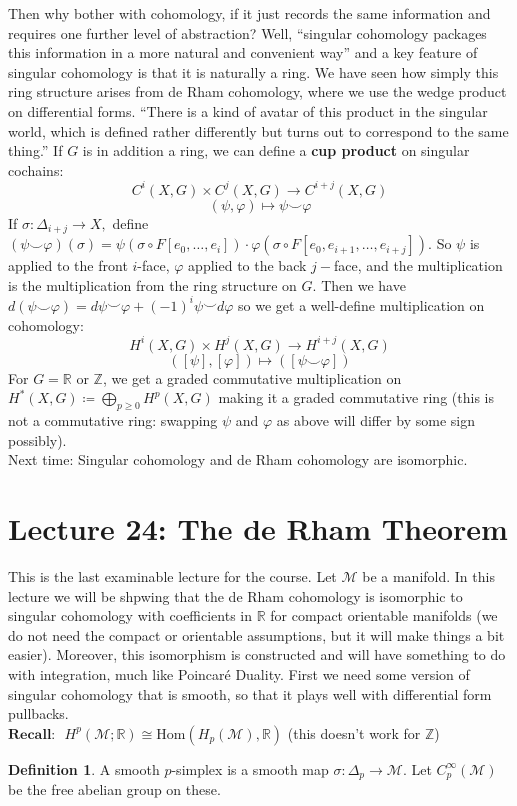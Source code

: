 \documentclass[10pt]{article}
\theoremstyle{plain}
\theoremstyle{definition}
\newtheorem{defn}[thm]{Definition} %
\newcommand{\Recall}{\textbf{Recall: }}
\newcommand{\Real}{\mathbb{R}}
\newcommand{\man}{\mathcal{M}}
\newcommand{\Hom}[2]{\text{Hom}\left(#1,#2\right)}
\newcommand{\deriv}{d}
\newcommand{\Zint}{\mathbb{Z}}
\newcommand{\mysection}[1]{
    \section*{#1}
    \addcontentsline{toc}{section}{#1}
    \addtocounter{section}{1}
    \setcounter{subsection}{0}

}
\begin{document}
Then why bother with cohomology, if it just records the same information and requires one further level of abstraction? Well, ``singular cohomology packages this information in a more natural and convenient way'' and a key feature of singular cohomology is that it is naturally a ring. We have seen how simply this ring structure arises from de Rham cohomology, where we use the wedge product on differential forms. ``There is a kind of avatar of this product in the singular world, which is defined rather differently but turns out to correspond to the same thing.'' If $G$ is in addition a ring, we can define a \textbf{cup product} on singular cochains:
$$C^i(X,G) \times C^j(X,G) \to C^{i+j}(X,G)$$
$$(\psi, \varphi) \mapsto \psi \smile \varphi$$
If $\sigma : \Delta_{i+j} \to X,$ define $(\psi \smile \varphi)(\sigma) = \psi(\sigma \circ F[e_0,\ldots,e_i]) \cdot \varphi(\sigma \circ F[e_0, e_{i+1} , \ldots , e_{i+j}])$. So $\psi$ is applied to the front $i$-face, $\varphi$ applied to the back $j-$face, and the multiplication is the multiplication from the ring structure on $G$. Then we have $\deriv(\psi \smile \varphi) = \deriv \psi \smile \varphi + (-1)^i \psi \smile \deriv \varphi$ so we get a well-define multiplication on cohomology:
$$H^i(X,G) \times H^j(X,G) \to H^{i+j}(X,G) $$
$$([\psi] ,[\varphi]) \mapsto ([\psi \smile \varphi])$$
For $G = \Real$ or $\Zint$, we get a graded commutative multiplication on $H^*(X,G) \coloneqq \bigoplus\limits_{p\geq 0} H^p(X,G)$ making it a graded commutative ring (this is not a commutative ring: swapping $\psi$ and $\varphi$ as above will differ by some sign possibly).\\
Next time: Singular cohomology and de Rham cohomology are isomorphic.

\mysection{Lecture 24: The de Rham Theorem}
This is the last examinable lecture for the course. Let $\man$ be a manifold. In this lecture we will be shpwing that the de Rham cohomology is isomorphic to singular cohomology with coefficients in $\Real$ for compact orientable manifolds (we do not need the compact or orientable assumptions, but it will make things a bit easier). Moreover, this isomorphism is constructed and will have something to do with integration, much like Poincar\'e Duality. First we need some version of singular cohomology that is smooth, so that it plays well with differential form pullbacks.\\
$\Recall$ $H^p(\man;\Real) \cong \Hom{H_p(\man)}{\Real}$ (this doesn't work for $\Zint$)

\begin{defn}
    A smooth $p$-simplex is a smooth map $\sigma : \Delta_p \to \man$. Let $C^\infty_p(\man) $ be the free abelian group on these.
\end{defn}
\end{document}
